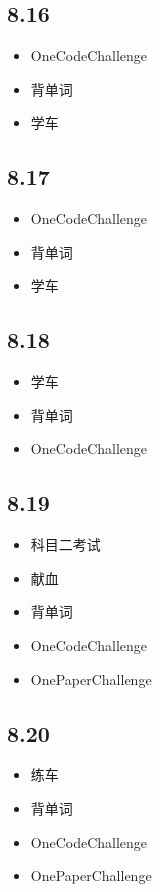 \documentclass[UTF8]{ctexart}
\begin{document}
\subsection*{8.16}
\begin{itemize}
    \item OneCodeChallenge
    \item 背单词
    \item 学车
\end{itemize}

\subsection*{8.17}
\begin{itemize}
    \item OneCodeChallenge
    \item 背单词
    \item 学车
\end{itemize}

\subsection*{8.18}
\begin{itemize}
    \item 学车
    \item 背单词
    \item OneCodeChallenge
\end{itemize}

\subsection*{8.19}
\begin{itemize}
    \item 科目二考试
    \item 献血
    \item 背单词
    \item OneCodeChallenge
    \item OnePaperChallenge
\end{itemize}

\subsection*{8.20}
\begin{itemize}
    \item 练车
    \item 背单词
    \item OneCodeChallenge
    \item OnePaperChallenge
\end{itemize}
\end{document}
